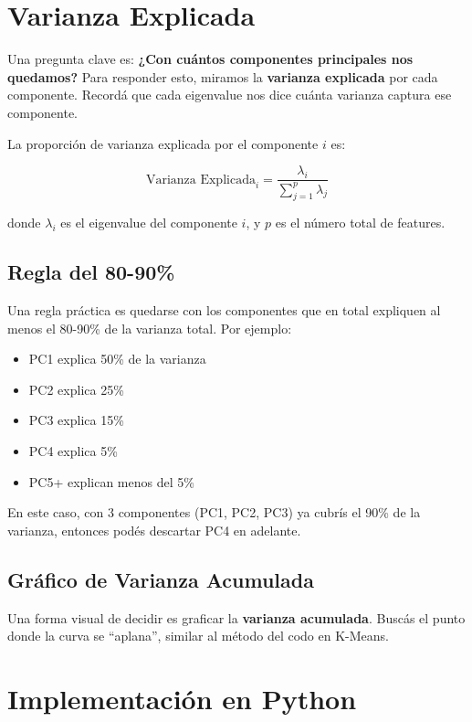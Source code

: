 \documentclass[12pt]{article}
\begin{document}
\section{Varianza Explicada}

Una pregunta clave es: \textbf{¿Con cuántos componentes principales nos quedamos?} Para responder esto, miramos la \textbf{varianza explicada} por cada componente. Recordá que cada eigenvalue nos dice cuánta varianza captura ese componente.

\vspace{0.5em}

La proporción de varianza explicada por el componente $i$ es:

\[
\text{Varianza Explicada}_i = \frac{\lambda_i}{\sum_{j=1}^{p} \lambda_j}
\]

donde $\lambda_i$ es el eigenvalue del componente $i$, y $p$ es el número total de features.

\subsection{Regla del 80-90\%}

Una regla práctica es quedarse con los componentes que en total expliquen al menos el 80-90\% de la varianza total. Por ejemplo:

\begin{itemize}
    \item PC1 explica 50\% de la varianza
    \item PC2 explica 25\%
    \item PC3 explica 15\%
    \item PC4 explica 5\%
    \item PC5+ explican menos del 5\%
\end{itemize}

En este caso, con 3 componentes (PC1, PC2, PC3) ya cubrís el 90\% de la varianza, entonces podés descartar PC4 en adelante.

\subsection{Gráfico de Varianza Acumulada}

Una forma visual de decidir es graficar la \textbf{varianza acumulada}. Buscás el punto donde la curva se ``aplana'', similar al método del codo en K-Means.

\section{Implementación en Python}
\end{document}
